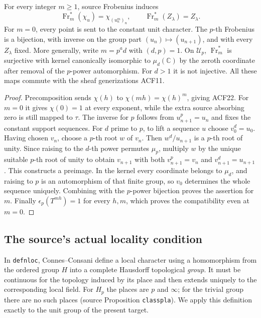 \begin{proposition}
For every integer $m\ge1$, source Frobenius induces
\begin{equation}\tag{ACF22}
 \operatorname{Fr}_m^*(\chi_u)=\chi_{(u_n^m)_n},\qquad
 \operatorname{Fr}_m^*(Z_\lambda)=Z_\lambda.
\end{equation}
For $m=0$, every point is sent to the constant unit character.
The $p$-th Frobenius is a bijection, with inverse on the group part
$(u_n)\mapsto(u_{n+1})$, and with every $Z_\lambda$ fixed.
More generally, write $m=p^a d$ with $(d,p)=1$. On $\mathcal U_p$,
$\operatorname{Fr}_m^*$ is surjective with kernel canonically isomorphic
to $\mu_d(\mathbb C)$ by the zeroth coordinate after removal of the
$p$-power automorphism. For $d>1$ it is not injective.
All these maps commute with the sheaf generizations ACF11.
\end{proposition}
\begin{proof}
Precomposition sends $\chi(h)$ to $\chi(mh)=\chi(h)^m$, giving ACF22.
For $m=0$ it gives $\chi(0)=1$ at every exponent, while the extra source
absorbing zero is still mapped to $\tau$. The inverse for $p$ follows
from $u_{n+1}^p=u_n$ and fixes the constant support sequences.
For $d$ prime to $p$, to lift a sequence $u$ choose $v_0^d=u_0$.
Having chosen $v_n$, choose a $p$-th root $w$ of $v_n$.
Then $w^d/u_{n+1}$ is a $p$-th root of unity. Since raising to the
$d$-th power permutes $\mu_p$, multiply $w$ by the unique suitable
$p$-th root of unity to obtain $v_{n+1}$ with both
$v_{n+1}^p=v_n$ and $v_{n+1}^d=u_{n+1}$. This constructs a preimage.
In the kernel every coordinate belongs to $\mu_d$, and raising to
$p$ is an automorphism of that finite group, so $v_0$ determines the
whole sequence uniquely. Combining with the $p$-power bijection proves
the assertion for $m$. Finally $\epsilon_p(T^{mh})=1$ for every $h,m$,
which proves the compatibility even at $m=0$.
\end{proof}

\subsection{The source's actual locality condition}
In \texttt{defnloc}, Connes--Consani define a local character using a
homomorphism from the ordered group $H$ into a complete Hausdorff
topological \emph{group}. It must be continuous for the topology induced
by its place and then extends uniquely to the corresponding local field.
For $H_p$ the places are $p$ and $\infty$; for the trivial group there
are no such places (source Proposition \texttt{classpla}). We apply
this definition exactly to the unit group of the present target.

